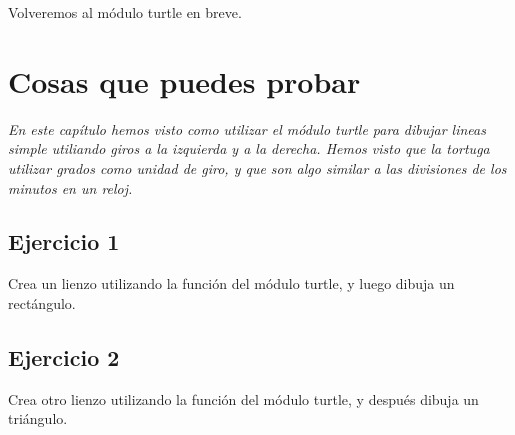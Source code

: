 \noindent
Volveremos al módulo turtle en breve.

\section{Cosas que puedes probar}

\emph{En este capítulo hemos visto como utilizar el módulo turtle para dibujar lineas simple utiliando giros a la izquierda y a la derecha.  Hemos visto que la tortuga utilizar grados como unidad de giro, y que son algo similar a las divisiones de los minutos en un reloj.}

\subsection*{Ejercicio 1}
Crea un lienzo utilizando la función  del módulo turtle, y luego dibuja un rectángulo.

\subsection*{Ejercicio 2}
Crea otro lienzo utilizando la función  del módulo turtle, y después dibuja un triángulo.

\newpage
